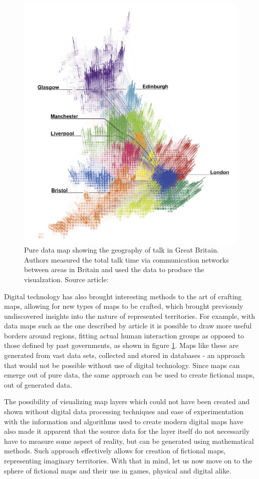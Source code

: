\documentclass[12pt]{report}
\begin{document}
\begin{figure}[h!]
	\centering
	\includegraphics[width=0.6\linewidth]{images/journal_netw_talk_map}
	\caption{Pure data map showing the geography of talk in Great Britain. Authors measured the total talk time via communication networks between areas in Britain and used the data to produce the visualzation. Source article: \autocite{10.1371/journal.pone.0014248}}
	\label{fig:journalnetwtalkmap}
\end{figure}


Digital technology has also brought interesting methods to the art of crafting maps, allowing for new types of maps to be crafted, which brought previously undiscovered insights into the nature of represented territories. For example, with data maps such as the one described by article \autocite{10.1371/journal.pone.0014248} it is possible to draw more useful borders around regions, fitting actual human interaction groups as opposed to those defined by past governments, as shown in figure \ref{fig:journalnetwtalkmap}. Maps like these are generated from vast data sets, collected and stored in databases - an approach that would not be possible without use of digital technology. Since maps can emerge out of pure data, the same approach can be used to create fictional maps, out of generated data.

The possibility of visualizing map layers which could not have been created and shown without digital data processing techniques and ease of experimentation with the information and algorithms used to create modern digital maps have also made it apparent that the source data for the layer itself do not necessarily have to measure some aspect of reality, but can be generated using mathematical methods. Such approach effectively allows for creation of fictional maps, representing imaginary territories. With that in mind, let us now move on to the sphere of fictional maps and their use in games, physical and digital alike. 
\end{document}
